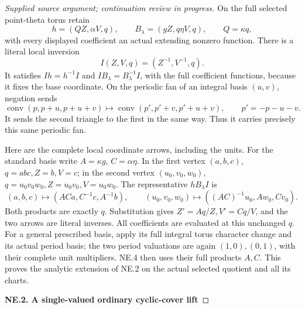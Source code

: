 \begin{proof}[Supplied source argument; continuation review in progress]
On the full selected point-theta torus retain
\[
 h=(QZ,\alpha V,q),\qquad B_\lambda=(gZ,q\eta V,q),
 \qquad Q=\kappa q,
 \tag{NE.1}
\]
with every displayed coefficient an actual extending nonzero function.
There is a literal local inversion
\[
                  I(Z,V,q)=(Z^{-1},V^{-1},q).
 \tag{NE.2}
\]
It satisfies \(Ih=h^{-1}I\) and
\(IB_\lambda=B_\lambda^{-1}I\), with the full coefficient functions,
because it fixes the base coordinate. On the periodic fan of an
integral basis \((u,v)\), negation sends
\[
 \operatorname{conv}(p,p+u,p+u+v)
 \longmapsto
 \operatorname{conv}(p',p'+v,p'+u+v),\qquad p'=-p-u-v.
 \tag{NE.3}
\]
It sends the second triangle to the first in the same way. Thus it
carries precisely this same periodic fan.

Here are the complete local coordinate arrows, including the units.
For the standard basis write
\(A=\kappa g\), \(C=\alpha\eta\). In the first vertex
\((a,b,c)\), \(q=abc,Z=b,V=c\); in the second vertex
\((u_0,v_0,w_0)\), \(q=u_0v_0w_0,Z=u_0v_0,V=u_0w_0\).
The representative \(hB_\lambda I\) is
\[
 (a,b,c)\longmapsto(ACa,C^{-1}c,A^{-1}b),\qquad
 (u_0,v_0,w_0)\longmapsto((AC)^{-1}u_0,Aw_0,Cv_0).
 \tag{NE.4}
\]
Both products are exactly \(q\). Substitution gives
\(Z'=Aq/Z,V'=Cq/V\), and the two arrows are literal inverses.
All coefficients are evaluated at this unchanged \(q\). For a
general prescribed basis, apply its full integral torus character
change and its actual period basis; the two period valuations are
again \((1,0),(0,1)\), with their complete unit multipliers. NE.4
then uses their full products \(A,C\). This proves the analytic
extension of NE.2 on the actual selected quotient and all its charts.

\par

\medskip\noindent\textbf{NE.2. A single-valued ordinary cyclic-cover lift}

\par\nobreak


\end{proof}
